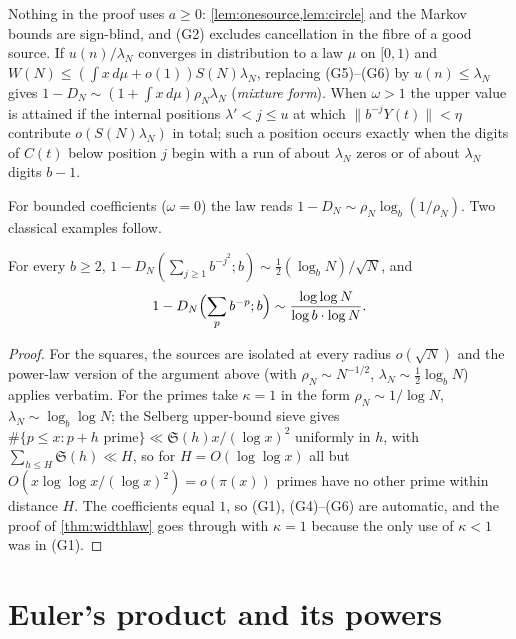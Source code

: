 \documentclass[11pt]{article}
\newcommand{\dist}[1]{\lVert #1\rVert}
\newcommand{\cnt}{\#}
\begin{document}
\begin{remark}\label{rem:widthlaw}
Nothing in the proof uses $a\ge0$: \cref{lem:onesource,lem:circle} and the Markov bounds
are sign-blind, and (G2) excludes cancellation in the fibre of a good source. If
$u(n)/\lambda_N$ converges in distribution to a law $\mu$ on $[0,1)$ and
$W(N)\le(\int x\,d\mu+o(1))S(N)\lambda_N$, replacing (G5)--(G6) by $u(n)\le\lambda_N$ gives
$1-D_N\sim(1+\int x\,d\mu)\rho_N\lambda_N$ (\emph{mixture form}). When $\omega>1$ the
upper value is attained if the internal positions $\lambda'<j\le u$ at which
$\dist{b^{-j}Y(t)}<\eta$ contribute $o(S(N)\lambda_N)$ in total; such a position occurs
exactly when the digits of $C(t)$ below position $j$ begin with a run of about
$\lambda_N$ zeros or of about $\lambda_N$ digits $b-1$.
\end{remark}

For bounded coefficients ($\omega=0$) the law reads $1-D_N\sim\rho_N\log_b(1/\rho_N)$. Two
classical examples follow.

\begin{corollary}\label{cor:primes}
For every $b\ge2$, $1-D_N(\sum_{j\ge1}b^{-j^2};b)\sim\frac12(\log_bN)/\sqrt N$, and
\[
1-D_N\Bigl(\sum_pb^{-p};b\Bigr)\sim\frac{\log\log N}{\log b\cdot\log N}.
\]
\end{corollary}

\begin{proof}
For the squares, the sources are isolated at every radius $o(\sqrt N)$ and the power-law
version of the argument above (with $\rho_N\sim N^{-1/2}$, $\lambda_N\sim\frac12\log_bN$)
applies verbatim. For the primes take $\kappa=1$ in the form $\rho_N\sim1/\log N$,
$\lambda_N\sim\log_b\log N$; the Selberg upper-bound sieve
\cite[Ch.~3]{HalberstamRichert} gives
$\cnt\{p\le x:p+h\text{ prime}\}\ll\mathfrak S(h)x/(\log x)^2$ uniformly in $h$, with
$\sum_{h\le H}\mathfrak S(h)\ll H$, so for $H=O(\log\log x)$ all but
$O(x\log\log x/(\log x)^2)=o(\pi(x))$ primes have no other prime within distance $H$. The coefficients equal $1$, so (G1), (G4)--(G6) are
automatic, and the proof of \cref{thm:widthlaw} goes through with $\kappa=1$ because the
only use of $\kappa<1$ was in (G1).
\end{proof}

\section{Euler's product and its powers}\label{sec:euler}
\end{document}
